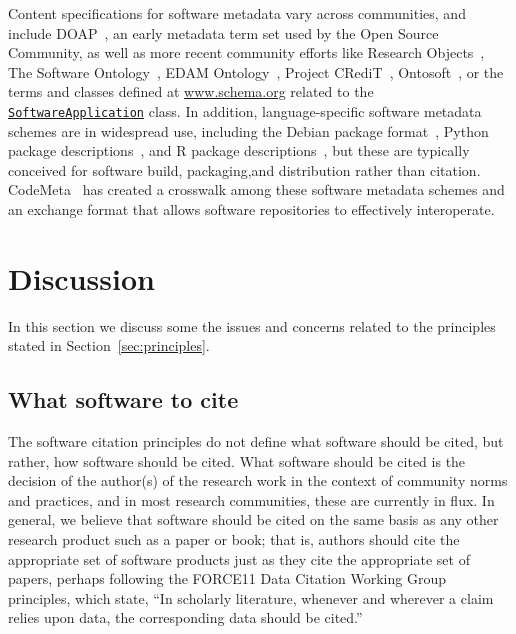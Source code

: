 \documentclass[11pt, oneside]{amsart}
\begin{document}
Content specifications for software metadata vary across communities, and
include DOAP~\cite{DOAP}, an early metadata
term set used by the Open Source Community, as well as more recent community
efforts like Research Objects~\cite{Bechhofer2013599}, The Software Ontology~\cite{Malone2014}, EDAM Ontology~\cite{Ison15052013}, Project
CRediT~\cite{casrai-credit}, Ontosoft~\cite{ontosoft},
or the terms and classes defined at \href{https://schema.org}{www.schema.org} related to the
\href{https://schema.org/SoftwareApplication}{\texttt{SoftwareApplication}} class.   In addition,
language-specific software metadata schemes are in widespread use, including the Debian
package format~\cite{Debian_policy}, Python package descriptions~\cite{pypi}, and R package descriptions~\cite{wickham_r_2015}, but these are typically
conceived for software build, packaging,and distribution rather than citation.  CodeMeta~\cite{codemeta}
has created a crosswalk among these software metadata schemes and an exchange format that
allows software repositories to effectively interoperate.


\section{Discussion}
\label{sec:discussion}

In this section we discuss some the issues and concerns related to the principles stated in Section~\ref{sec:principles}.

\subsection{What software to cite}

The software citation principles do not define what software should be cited, but rather, how software should be cited.
What software should be cited is the decision of the author(s) of the research work in the context of community norms and practices, and in most research communities, these are currently in flux.
In general, we believe that software should be cited on the same basis as any other research product such as a paper or book; that is, authors should cite the appropriate set of software products just as they cite the appropriate set of papers, perhaps following the
FORCE11 Data Citation Working Group principles, which state, ``In scholarly literature, whenever and wherever a claim relies upon data, the corresponding data should be cited.''~\cite{data-citation-principles}
\end{document}
